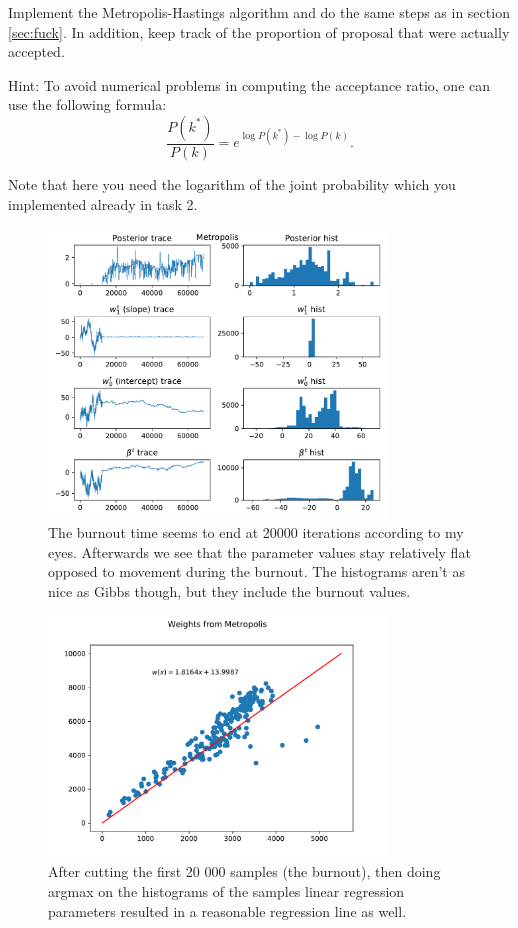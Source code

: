 \documentclass[12pt]{article}
\begin{document}
    \begin{tcolorbox}
        Implement the Metropolis-Hastings algorithm and do the same steps as in section \ref{sec:fuck}. In addition, keep track of the proportion of proposal that were actually accepted.
        
        \vspace{3mm}
        Hint: To avoid numerical problems in computing the acceptance ratio,
        one can use the following formula:
        $$\frac{P(k^*)}{P(k)}=e^{\log P(k^*)-\log P(k)}.$$

        Note that here you need the logarithm of the joint probability which you implemented already in task 2.
    \end{tcolorbox}
    \begin{figure}[H]
        \centering
        \includegraphics[width=0.8\textwidth]{metropolis2.pdf}
        \caption{The burnout time seems to end at 20000 iterations according to my eyes. Afterwards we see that the parameter values stay relatively flat opposed to movement during the burnout. The histograms aren't as nice as Gibbs though, but they include the burnout values.}        
    \end{figure}
    \begin{figure}[H]
        \centering
        \includegraphics[width=0.8\textwidth]{regline_metropolis.pdf}
        \caption{After cutting the first 20 000 samples (the burnout), then doing argmax on the histograms of the samples linear regression parameters resulted in a reasonable regression line as well.}        
    \end{figure}
\end{document}
